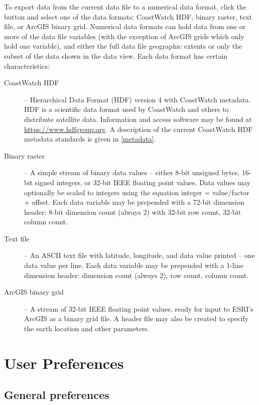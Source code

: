 To export data from the current data file to a numerical data
format, click the  button and select one
of the data formats: CoastWatch HDF, binary raster, text file, or
ArcGIS binary grid.  Numerical data formats can hold data from
one or more of the data file variables (with the exception of
ArcGIS grids which only hold one variable), and either the full
data file geographic extents or only the subset of the data shown
in the data view.  Each data format has certain characteristics:
\begin{description}

\item[CoastWatch HDF] -- Hierarchical Data Format (HDF) version 4
with CoastWatch metadata. HDF is a scientific data format used by
CoastWatch and others to distribute satellite data. Information
and access software may be found at
\url{https://www.hdfgroup.org}. A description of the current
CoastWatch HDF metadata standards is given in \autoref{metadata}.

\item[Binary raster] -- A simple stream of binary data values --
either 8-bit unsigned bytes, 16-bit signed integers, or 32-bit
IEEE floating point values. Data values may optionally be scaled
to integers using the equation integer = value/factor +
offset. Each data variable may be prepended with a 72-bit
dimension header: 8-bit dimension count (always 2) with 32-bit
row count, 32-bit column count.

\item[Text file] -- An ASCII text file with latitude, longitude,
and data value printed -- one data value per line. Each data
variable may be prepended with a 1-line dimension header:
dimension count (always 2), row count, column count.

\item[ArcGIS binary grid] -- A stream of 32-bit IEEE floating
point values, ready for input to ESRI's ArcGIS as a binary grid
file. A header file may also be created to specify the earth
location and other parameters.

\end{description}

\section{User Preferences}
\label{preferences}

\subsection{General preferences}

